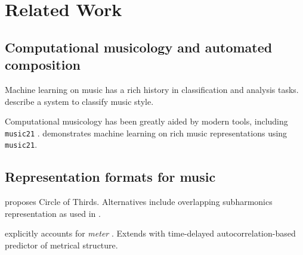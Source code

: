 \documentclass[dissertation.tex]{subfiles}
\begin{document}
\chapter{Related Work}



\section{Computational musicology and automated composition}

Machine learning on music has a rich history in classification and analysis tasks.
\cite{Herlands2014} describe a system to classify music style.

Computational musicology has been greatly aided by modern tools, including
\texttt{music21} \cite{Scott2015}. \cite{Cuthbert2011} demonstrates machine
learning on rich music representations using \texttt{music21}.

\section{Representation formats for music}

\cite{franklin2004recurrent} proposes Circle of Thirds. Alternatives
include overlapping subharmonics representation\cite{laden1989representation}
as used in \cite{mozer1994neural}.

\cite{eck2008learning} explicitly accounts for \emph{meter} . Extends \cite{Eck2002} with time-delayed
autocorrelation-based predictor of metrical structure.
\end{document}
